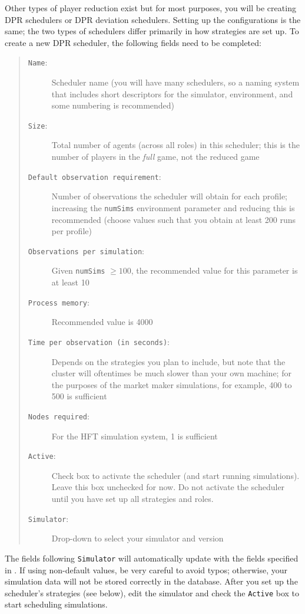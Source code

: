 \documentclass[11pt]{article}
\begin{document}
Other types of player reduction exist but for most purposes, you will be creating DPR schedulers or DPR deviation schedulers.
Setting up the configurations is the same; the two types of schedulers differ primarily in how strategies are set up.
To create a new DPR scheduler, the following fields need to be completed:
\begin{quote}
\begin{description}
\item[\texttt{Name}:] Scheduler name (you will have many schedulers, so a naming system that includes short descriptors for the simulator, environment, and some numbering is recommended)
\item[\texttt{Size}:] Total number of agents (across all roles) in this scheduler; this is the number of players in the \emph{full} game, not the reduced game
\item[\texttt{Default observation requirement}:] Number of observations the scheduler will obtain for each profile; increasing the \verb|numSims| environment parameter and reducing this is recommended (choose values such that you obtain at least 200 runs per profile)
\item[\texttt{Observations per simulation}:] Given \verb|numSims| $\geq 100$, the recommended value for this parameter is at least 10
\item[\texttt{Process memory}:] Recommended value is 4000
\item[\texttt{Time per observation (in seconds)}:] Depends on the strategies you plan to include, but note that the cluster will oftentimes be much slower than your own machine; for the purposes of the market maker simulations, for example, 400 to 500 is sufficient
\item[\texttt{Nodes required}:] For the HFT simulation system, 1 is sufficient
\item[\texttt{Active}:] Check box to activate the scheduler (and start running simulations). Leave this box unchecked for now.
Do not activate the scheduler until you have set up all strategies and roles.
\item[\texttt{Simulator}:] Drop-down to select your simulator and version
\end{description}
\end{quote}
The fields following \texttt{Simulator} will automatically update with the fields specified in . If using non-default values, be very careful to avoid typos; otherwise, your simulation data will not be stored correctly in the database.
After you set up the scheduler's strategies (see below), edit the simulator and check the \texttt{Active} box to start scheduling simulations.
\end{document}
